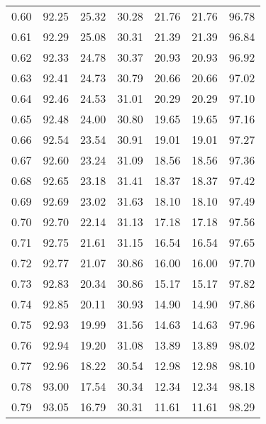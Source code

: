 \begin{tabular}{|c|c|c|c|c|c|c|}
      0.60 &     92.25 &     25.32 &      30.28 &   21.76 &      21.76 &         96.78 \\
      0.61 &     92.29 &     25.08 &      30.31 &   21.39 &      21.39 &         96.84 \\
      0.62 &     92.33 &     24.78 &      30.37 &   20.93 &      20.93 &         96.92 \\
      0.63 &     92.41 &     24.73 &      30.79 &   20.66 &      20.66 &         97.02 \\
      0.64 &     92.46 &     24.53 &      31.01 &   20.29 &      20.29 &         97.10 \\
      0.65 &     92.48 &     24.00 &      30.80 &   19.65 &      19.65 &         97.16 \\
      0.66 &     92.54 &     23.54 &      30.91 &   19.01 &      19.01 &         97.27 \\
      0.67 &     92.60 &     23.24 &      31.09 &   18.56 &      18.56 &         97.36 \\
      0.68 &     92.65 &     23.18 &      31.41 &   18.37 &      18.37 &         97.42 \\
      0.69 &     92.69 &     23.02 &      31.63 &   18.10 &      18.10 &         97.49 \\
      0.70 &     92.70 &     22.14 &      31.13 &   17.18 &      17.18 &         97.56 \\
      0.71 &     92.75 &     21.61 &      31.15 &   16.54 &      16.54 &         97.65 \\
      0.72 &     92.77 &     21.07 &      30.86 &   16.00 &      16.00 &         97.70 \\
      0.73 &     92.83 &     20.34 &      30.86 &   15.17 &      15.17 &         97.82 \\
      0.74 &     92.85 &     20.11 &      30.93 &   14.90 &      14.90 &         97.86 \\
      0.75 &     92.93 &     19.99 &      31.56 &   14.63 &      14.63 &         97.96 \\
      0.76 &     92.94 &     19.20 &      31.08 &   13.89 &      13.89 &         98.02 \\
      0.77 &     92.96 &     18.22 &      30.54 &   12.98 &      12.98 &         98.10 \\
      0.78 &     93.00 &     17.54 &      30.34 &   12.34 &      12.34 &         98.18 \\
      0.79 &     93.05 &     16.79 &      30.31 &   11.61 &      11.61 &         98.29 \\

\end{tabular}
